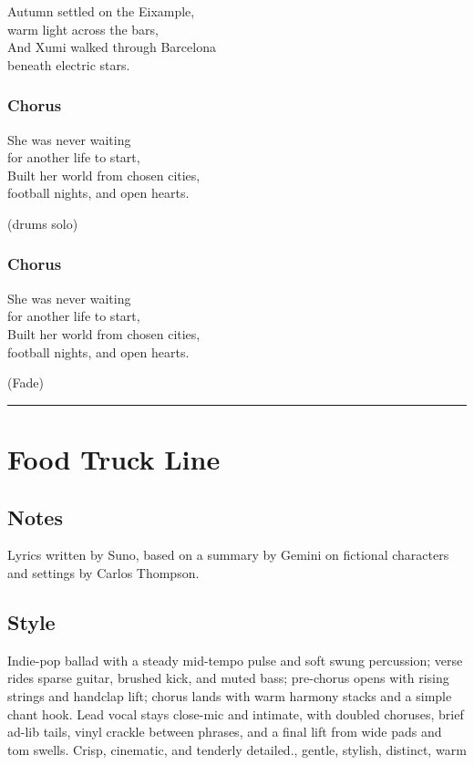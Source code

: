 Autumn settled on the Eixample,\\
warm light across the bars,\\
And Xumi walked through Barcelona\\
beneath electric stars.

\subsubsection{Chorus}\label{chorus-5}

She was never waiting\\
for another life to start,\\
Built her world from chosen cities,\\
football nights, and open hearts.

(drums solo)

\subsubsection{Chorus}\label{chorus-6}

She was never waiting\\
for another life to start,\\
Built her world from chosen cities,\\
football nights, and open hearts.

(Fade)

\begin{center}\rule{0.5\linewidth}{0.5pt}\end{center}

\section{Food Truck Line}\label{food-truck-line}

\subsection{Notes}\label{notes-5}

Lyrics written by Suno, based on a summary by Gemini on fictional
characters and settings by Carlos Thompson.

\subsection{Style}\label{style-5}

Indie-pop ballad with a steady mid-tempo pulse and soft swung
percussion; verse rides sparse guitar, brushed kick, and muted bass;
pre-chorus opens with rising strings and handclap lift; chorus lands
with warm harmony stacks and a simple chant hook. Lead vocal stays
close-mic and intimate, with doubled choruses, brief ad-lib tails, vinyl
crackle between phrases, and a final lift from wide pads and tom swells.
Crisp, cinematic, and tenderly detailed., gentle, stylish, distinct,
warm

